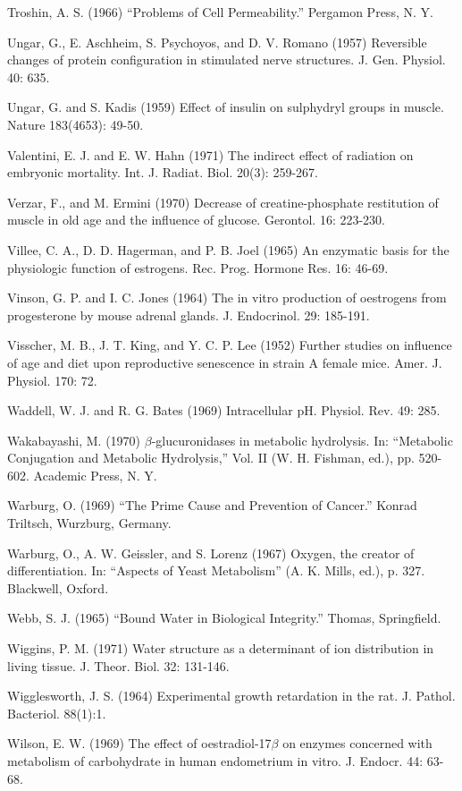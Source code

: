 Troshin, A. S. (1966) ``Problems of Cell Permeability.'' Pergamon Press, N. Y.

Ungar, G., E. Aschheim, S. Psychoyos, and D. V. Romano (1957) Reversible changes of protein configuration in stimulated nerve structures. J. Gen. Physiol. 40: 635.

Ungar, G. and S. Kadis (1959) Effect of insulin on sulphydryl groups in muscle. Nature 183(4653): 49-50.

Valentini, E. J. and E. W. Hahn (1971) The indirect effect of radiation on embryonic mortality. Int. J. Radiat. Biol. 20(3): 259-267.

Verzar, F., and M. Ermini (1970) Decrease of creatine-phosphate restitution of muscle in old age and the influence of glucose. Gerontol. 16: 223-230.

Villee, C. A., D. D. Hagerman, and P. B. Joel (1965) An enzymatic basis for the physiologic function of estrogens. Rec. Prog. Hormone Res. 16: 46-69.

Vinson, G. P. and I. C. Jones (1964) The in vitro production of oestrogens from progesterone by mouse adrenal glands. J. Endocrinol. 29: 185-191.

Visscher, M. B., J. T. King, and Y. C. P. Lee (1952) Further studies on influence of age and diet upon reproductive senescence in strain A female mice. Amer. J. Physiol. 170: 72.

Waddell, W. J. and R. G. Bates (1969) Intracellular pH. Physiol. Rev. 49: 285.

Wakabayashi, M. (1970) $\beta$-glucuronidases in metabolic hydrolysis. In: ``Metabolic Conjugation and Metabolic Hydrolysis,'' Vol. II (W. H. Fishman, ed.), pp. 520-602. Academic Press, N. Y.

Warburg, O. (1969) ``The Prime Cause and Prevention of Cancer.'' Konrad Triltsch, Wurzburg, Germany.

Warburg, O., A. W. Geissler, and S. Lorenz (1967) Oxygen, the creator of differentiation. In: ``Aspects of Yeast Metabolism'' (A. K. Mills, ed.), p. 327. Blackwell, Oxford.

Webb, S. J. (1965) ``Bound Water in Biological Integrity.'' Thomas, Springfield.

Wiggins, P. M. (1971) Water structure as a determinant of ion distribution in living tissue. J. Theor. Biol. 32: 131-146.

Wigglesworth, J. S. (1964) Experimental growth retardation in the rat. J. Pathol. Bacteriol. 88(1):1.

Wilson, E. W. (1969) The effect of oestradiol-17$\beta$ on enzymes concerned with metabolism of carbohydrate in human endometrium in vitro. J. Endocr. 44: 63-68.

